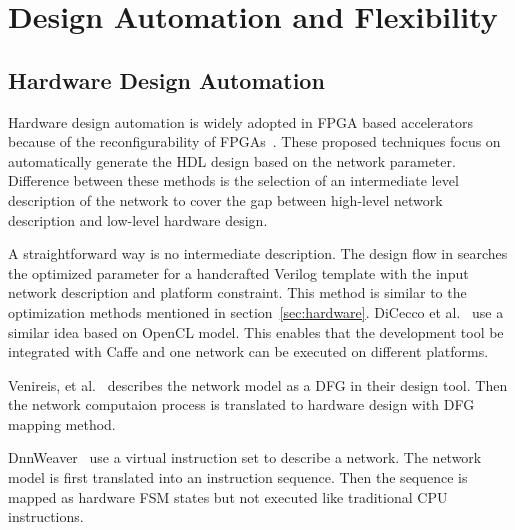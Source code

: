 \section{Design Automation and Flexibility}\label{sec:flexibility}


\subsection{Hardware Design Automation}
Hardware design automation is widely adopted in FPGA based accelerators because of the reconfigurability of FPGAs~\cite{venieris2017fpgaconvnet, morcel2017minimalist, ma2017automatic, venieris2017latency, dicecco2016caffeinated, wang2016deepburning, sharma2016high}. These proposed techniques focus on automatically generate the HDL design based on the network parameter. Difference between these methods is the selection of an intermediate level description of the network to cover the gap between high-level network description and low-level hardware design.

A straightforward way is no intermediate description. The design flow in \cite{ma2017automatic} searches the optimized parameter for a handcrafted Verilog template with the input network description and platform constraint. This method is similar to the optimization methods mentioned in section~\ref{sec:hardware}. DiCecco et al.~\cite{dicecco2016caffeinated} use a similar idea based on OpenCL model. This enables that the development tool be integrated with Caffe and one network can be executed on different platforms. 

Venireis, et al.~\cite{venieris2017latency} describes the network model as a DFG in their design tool. Then the network computaion process is translated to hardware design with DFG mapping method.

DnnWeaver~\cite{sharma2016high} use a virtual instruction set to describe a network. The network model is first translated into an instruction sequence. Then the sequence is mapped as hardware FSM states but not executed like traditional CPU instructions. 

